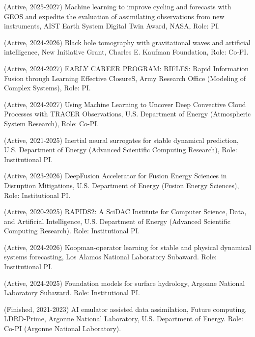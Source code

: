 \documentclass[letterpaper]{article}
\renewenvironment{itemize}{
  \begin{list}{}{
    \setlength{\leftmargin}{1.5em}
  }
}{
  \end{list}
}
\begin{document}
\begin{itemize}

  \item (Active, 2025-2027) Machine learning to improve cycling and forecasts with GEOS and expedite the evaluation of assimilating observations from new instruments, AIST Earth System Digital Twin Award, NASA, Role: PI.

  \item (Active, 2024-2026) Black hole tomography with gravitational waves and artificial intelligence, New Initiative Grant, Charles E. Kaufman Foundation, Role: Co-PI.

  \item (Active, 2024-2027) EARLY CAREER PROGRAM: RIFLES: Rapid Information Fusion through Learning Effective ClosureS, Army Research Office (Modeling of Complex Systems), Role: PI.

  \item (Active, 2024-2027) Using Machine Learning to Uncover Deep Convective Cloud Processes with TRACER Observations, U.S. Department of Energy (Atmospheric System Research), Role: Co-PI.

  \item (Active, 2021-2025) Inertial neural surrogates for stable dynamical prediction, U.S. Department of Energy (Advanced Scientific Computing Research), Role: Institutional PI.

  \item (Active, 2023-2026) DeepFusion Accelerator for Fusion Energy Sciences in Disruption Mitigations, U.S. Department of Energy (Fusion Energy Sciences), Role: Institutional PI.

  \item (Active, 2020-2025) RAPIDS2: A SciDAC Institute for Computer Science, Data, and Artificial Intelligence, U.S. Department of Energy (Advanced Scientific Computing Research). Role: Institutional PI.

  \item (Active, 2024-2026) Koopman-operator learning for stable and physical dynamical systems forecasting, Los Alamos National Laboratory Subaward. Role: Institutional PI.

  \item (Active, 2024-2025) Foundation models for surface hydrology, Argonne National Laboratory Subaward. Role: Institutional PI.

  \item (Finished, 2021-2023) AI emulator assisted data assimilation, Future computing, LDRD-Prime, Argonne National Laboratory, U.S. Department of Energy. Role: Co-PI (Argonne National Laboratory).


\end{itemize}
\end{document}
